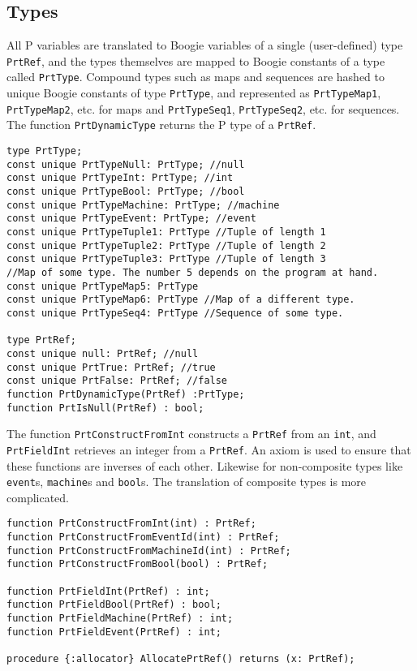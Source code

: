 \documentclass{llncs}
\begin{document}
\subsection{Types}
All P variables are translated to Boogie variables of a single (user-defined) type \texttt{PrtRef}, and the types themselves are mapped to Boogie constants of a type called \texttt{PrtType}. Compound types such as maps and sequences are hashed to unique Boogie constants of type \texttt{PrtType}, and represented as \texttt{PrtTypeMap1}, \texttt{PrtTypeMap2}, etc. for maps and \texttt{PrtTypeSeq1}, \texttt{PrtTypeSeq2}, etc. for sequences. The function \texttt{PrtDynamicType} returns the P type of a \texttt{PrtRef}.
\begin{verbatim}
type PrtType;
const unique PrtTypeNull: PrtType; //null 
const unique PrtTypeInt: PrtType; //int
const unique PrtTypeBool: PrtType; //bool
const unique PrtTypeMachine: PrtType; //machine
const unique PrtTypeEvent: PrtType; //event
const unique PrtTypeTuple1: PrtType //Tuple of length 1
const unique PrtTypeTuple2: PrtType //Tuple of length 2
const unique PrtTypeTuple3: PrtType //Tuple of length 3
//Map of some type. The number 5 depends on the program at hand.
const unique PrtTypeMap5: PrtType 
const unique PrtTypeMap6: PrtType //Map of a different type.
const unique PrtTypeSeq4: PrtType //Sequence of some type.

type PrtRef;
const unique null: PrtRef; //null
const unique PrtTrue: PrtRef; //true
const unique PrtFalse: PrtRef; //false
function PrtDynamicType(PrtRef) :PrtType;
function PrtIsNull(PrtRef) : bool;
\end{verbatim}

The function \texttt{PrtConstructFromInt} constructs a \texttt{PrtRef} from an \texttt{int}, and \texttt{PrtFieldInt} retrieves an integer from a \texttt{PrtRef}. An axiom is used to ensure that these functions are inverses of each other. Likewise for non-composite types like \texttt{event}s, \texttt{machine}s and \texttt{bool}s. The translation of composite types is more complicated. 
\begin{verbatim}
function PrtConstructFromInt(int) : PrtRef;
function PrtConstructFromEventId(int) : PrtRef;
function PrtConstructFromMachineId(int) : PrtRef;
function PrtConstructFromBool(bool) : PrtRef;

function PrtFieldInt(PrtRef) : int;
function PrtFieldBool(PrtRef) : bool;
function PrtFieldMachine(PrtRef) : int;
function PrtFieldEvent(PrtRef) : int;

procedure {:allocator} AllocatePrtRef() returns (x: PrtRef);
\end{verbatim}
\end{document}
